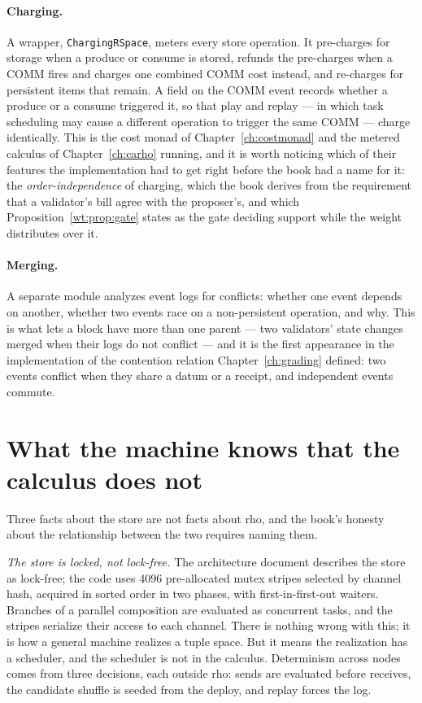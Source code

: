 \paragraph{Charging.} A wrapper, \texttt{ChargingRSpace}, meters every store operation. It
pre-charges for storage when a produce or consume is stored, refunds the pre-charges when a
COMM fires and charges one combined COMM cost instead, and re-charges for persistent items
that remain. A field on the COMM event records whether a produce or a consume triggered it,
so that play and replay --- in which task scheduling may cause a different operation to
trigger the same COMM --- charge identically. This is the cost monad of
Chapter~\ref{ch:costmonad} and the metered calculus of Chapter~\ref{ch:carho} running, and
it is worth noticing which of their features the implementation had to get right before
the book had a name for it: the \emph{order-independence} of charging, which the book
derives from the requirement that a validator's bill agree with the proposer's, and which
Proposition~\ref{wt:prop:gate} states as the gate deciding support while the weight
distributes over it.

\paragraph{Merging.} A separate module analyzes event logs for conflicts: whether one
event depends on another, whether two events race on a non-persistent operation, and why.
This is what lets a block have more than one parent --- two validators' state changes
merged when their logs do not conflict --- and it is the first appearance in the
implementation of the contention relation Chapter~\ref{ch:grading} defined: two events
conflict when they share a datum or a receipt, and independent events commute.

\section{What the machine knows that the calculus does not}
\label{rs:sec:knows}

Three facts about the store are not facts about rho, and the book's honesty about the
relationship between the two requires naming them.

\emph{The store is locked, not lock-free.} The architecture document describes the store
as lock-free; the code uses 4096 pre-allocated mutex stripes selected by channel hash,
acquired in sorted order in two phases, with first-in-first-out waiters. Branches of a
parallel composition are evaluated as concurrent tasks, and the stripes serialize their
access to each channel. There is nothing wrong with this; it is how a general machine
realizes a tuple space. But it means the realization has a scheduler, and the scheduler is
not in the calculus. Determinism across nodes comes from three decisions, each outside
rho: sends are evaluated before receives, the candidate shuffle is seeded from the deploy,
and replay forces the log.

